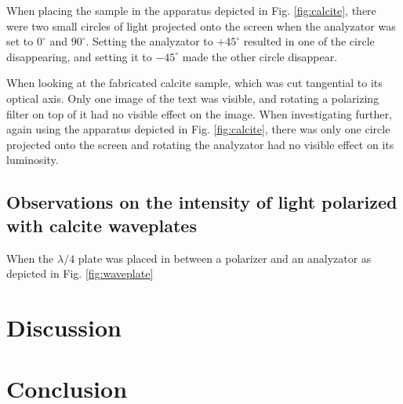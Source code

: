 \documentclass[11pt,a4paper, twocolumn]{article}
\begin{document}
    When placing the sample in the apparatus depicted in Fig. \ref{fig:calcite}, there were two small circles of light projected onto the screen when the analyzator was set to $0^\circ$ and $90^\circ$.  Setting the analyzator to $+45^\circ$ resulted in one of the circle disappearing, and setting it to $-45^\circ$ made the other circle disappear.

    When looking at the fabricated calcite sample, which was cut tangential to its optical axis. Only one image of the text was visible, and rotating a polarizing filter on top of it had no visible effect on the image. When investigating further, again using the apparatus depicted in Fig. \ref{fig:calcite}, there was only one circle projected onto the screen and rotating the analyzator had no visible effect on its luminosity. 

  \subsection{Observations on the intensity of light polarized with calcite waveplates}
    When the $\lambda/4$ plate was placed in between a polarizer and an analyzator as depicted in Fig. \ref{fig:waveplate}

\section{\label{sect:discuss}Discussion}

\section{\label{sect:conclusion}Conclusion}

\onecolumn




\end{document}
